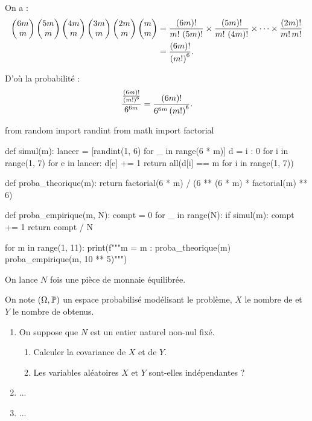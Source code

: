 \begin{corr}[Exercice 2, 2]
On a : \[\begin{aligned}
\binom{m}{6m}\binom{m}{5m}\binom{m}{4m}\binom{m}{3m}\binom{m}{2m}\binom{m}{m}&=\dfrac{\paren{6m}!}{m!\,\paren{5m}!}\times\dfrac{\paren{5m}!}{m!\,\paren{4m}!}\times\dots\times\dfrac{\paren{2m}!}{m!\,m!} \\
&=\dfrac{\paren{6m}!}{\paren{m!}^6}.
\end{aligned}\]

D'où la probabilité : \[\dfrac{\frac{\paren{6m}!}{\paren{m!}^6}}{6^{6m}}=\dfrac{\paren{6m}!}{6^{6m}\paren{m!}^6}.\]
\end{corr}

\begin{corr}[Exercice 2, 3]
\begin{code}
from random import randint
from math import factorial

def simul(m):
    lancer = [randint(1, 6) for _ in range(6 * m)]
    d = {i : 0 for i in range(1, 7)}
    for e in lancer:
        d[e] += 1
    return all(d[i] == m for i in range(1, 7))

def proba_theorique(m):
    return factorial(6 * m) / (6 ** (6 * m) * factorial(m) ** 6)

def proba_empirique(m, N):
    compt = 0
    for _ in range(N):
        if simul(m):
            compt += 1
    return compt / N

for m in range(1, 11):
    print(f"""m = {m} :
{proba_theorique(m)}
{proba_empirique(m, 10 ** 5)}""")
\end{code}
\end{corr}

\begin{exo}
On lance \(N\) fois une pièce de monnaie équilibrée.

On note \(\groupe{\Omega}[\prem]\) un espace probabilisé modélisant le problème, \(X\) le nombre de  et \(Y\) le nombre de  obtenus.

\begin{enumerate}
    \item On suppose que \(N\) est un entier naturel non-nul fixé. \\ \begin{enumerate}
        \item Calculer la covariance de \(X\) et de \(Y\). \\
        \item Les variables aléatoires \(X\) et \(Y\) sont-elles indépendantes ? \\
    \end{enumerate}
    \item ... \\
    \item ...
\end{enumerate}
\end{exo}

